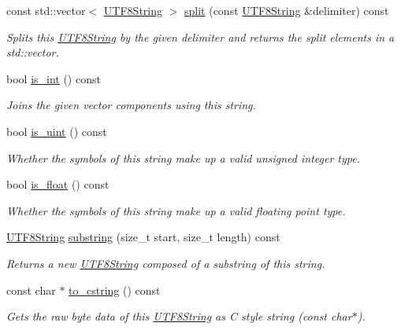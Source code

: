\begin{DoxyCompactItemize}
const std\+::vector$<$ \hyperlink{classchaos_1_1uni_1_1_u_t_f8_string}{U\+T\+F8\+String} $>$ \hyperlink{classchaos_1_1uni_1_1_u_t_f8_string_a7d9a171234e75c018c2a0824f77222e7}{split} (const \hyperlink{classchaos_1_1uni_1_1_u_t_f8_string}{U\+T\+F8\+String} \&delimiter) const 
\begin{DoxyCompactList}\small\item\em Splits this \hyperlink{classchaos_1_1uni_1_1_u_t_f8_string}{U\+T\+F8\+String} by the given delimiter and returns the split elements in a std\+::vector. \end{DoxyCompactList}\item 
bool \hyperlink{classchaos_1_1uni_1_1_u_t_f8_string_a758102d22056ad004660c49104526642}{is\+\_\+int} () const 
\begin{DoxyCompactList}\small\item\em Joins the given vector components using this string. \end{DoxyCompactList}\item 
bool \hyperlink{classchaos_1_1uni_1_1_u_t_f8_string_a0df001bc19b6ee2a9e843f88b82dbfe1}{is\+\_\+uint} () const 
\begin{DoxyCompactList}\small\item\em Whether the symbols of this string make up a valid unsigned integer type. \end{DoxyCompactList}\item 
bool \hyperlink{classchaos_1_1uni_1_1_u_t_f8_string_abc0b60f3ca6eff7782dc0e6a363ca919}{is\+\_\+float} () const 
\begin{DoxyCompactList}\small\item\em Whether the symbols of this string make up a valid floating point type. \end{DoxyCompactList}\item 
\hyperlink{classchaos_1_1uni_1_1_u_t_f8_string}{U\+T\+F8\+String} \hyperlink{classchaos_1_1uni_1_1_u_t_f8_string_abfc2bac44a9be97d0d27e7b245a7df6e}{substring} (size\+\_\+t start, size\+\_\+t length) const 
\begin{DoxyCompactList}\small\item\em Returns a new \hyperlink{classchaos_1_1uni_1_1_u_t_f8_string}{U\+T\+F8\+String} composed of a substring of this string. \end{DoxyCompactList}\item 
const char $\ast$ \hyperlink{classchaos_1_1uni_1_1_u_t_f8_string_a3435d4d7d8378c3c41a3e918ecd86d6f}{to\+\_\+cstring} () const 
\begin{DoxyCompactList}\small\item\em Gets the raw byte data of this \hyperlink{classchaos_1_1uni_1_1_u_t_f8_string}{U\+T\+F8\+String} as C style string ({\ttfamily const char$\ast$}). \end{DoxyCompactList}\item 

\end{DoxyCompactItemize}
